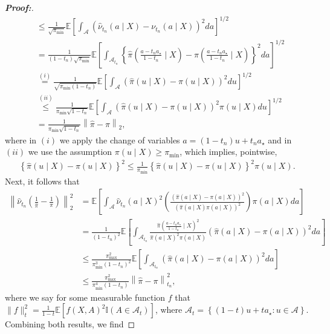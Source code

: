 \documentclass[11pt,twoside]{article}
\theoremstyle{definition}
\theoremstyle{remark}
\begin{document}
\begin{proof}[\textbf{Proof:}]
\begin{align*}
    &\leq \frac{1}{\sqrt{\pi_{\min}}}\mathbb{E}\left[ \int_{\mathcal{A}}(\widehat{\nu}_{t_n}(a \mid X) - \nu_{t_n}(a \mid X))^2 da \right]^{1/2}  \\
    &= \frac{1}{(1-t_n)\sqrt{\pi_{\min}}}\mathbb{E}\left[ \int_{\mathcal{A}_{t_n}}\left\{\widehat{\pi}\left( \frac{a-t_na_\star}{1-t_n} \mid X\right) - \pi\left( \frac{a-t_na_\star}{1-t_n} \mid X\right)\right\}^2 da \right]^{1/2}  \\
    &\overset{(i)}{=} \frac{1}{\sqrt{\pi_{\min}(1 - t_n)}}\mathbb{E}\left[ \int_{\mathcal{A}}(\widehat{\pi}(u \mid X) - \pi(u \mid X))^2 du \right]^{1/2} \\
    &\overset{(ii)}{\leq} \frac{1}{\pi_{\min} \sqrt{1 - t_n}}\mathbb{E}\left[ \int_{\mathcal{A}}(\widehat{\pi}(u \mid X) - \pi(u \mid X))^2 \pi(u \mid X) du \right]^{1/2} \\
    &= \frac{1}{\pi_{\min} \sqrt{1 - t_n}} \left\| \widehat{\pi} - \pi \right\|_2,
\end{align*}
where in $(i)$ we apply the change of variables $a=(1-t_n)u+t_na_\star$ and in $(ii)$ we use the assumption $\pi(u\mid X)\geq\pi_{\min}$, which implies, pointwise,
\begin{align*}
    \left\{ \widehat{\pi}(u\mid X)-\pi(u\mid X) \right\}^2 \leq \frac{1}{\pi_{\min}} \left\{ \widehat{\pi}(u\mid X)-\pi(u\mid X) \right\}^2 \pi(u\mid X).
\end{align*}
Next, it follows that
\begin{align*}
    \left\|\widehat{\nu}_{t_n} \left(\frac{1}{\widehat{\pi}} - \frac{1}{\pi}\right) \right\|^2_2 &= \mathbb{E}\left[ \int_{\mathcal{A}} \widehat{\nu}_{t_n}(a \mid X)^2 \left(\frac{(\widehat{\pi}(a \mid X) - \pi(a \mid X))^2}{(\widehat{\pi}(a \mid X) \pi(a \mid X))^2} \right)\pi(a \mid X) da \right] \\
    &=\frac{1}{(1-t_n)^2} \mathbb{E}\left[ \int_{\mathcal{A}_{t_n}}\frac{\widehat{\pi} \left( \frac{a-t_na_\star}{1-t_n} \mid X \right)^2}{ \widehat{\pi}(a\mid X)^2 \pi(a\mid X)} \left( \widehat{\pi}(a\mid X) - \pi(a\mid X)\right)^2 da \right]\\
    &\leq  \frac{\pi_{\max}^2 }{ \pi_{\min}^3(1-t_n)^2} \mathbb{E}\left[\int_{\mathcal{A}_{t_n}}\left( \widehat{\pi}(a\mid X) - \pi(a\mid X) \right)^2 da \right]\\
    &\leq \frac{ \pi_{\max}^2}{\pi_{\min}^4(1-t_n)} \left\| \widehat{\pi}-\pi \right\|_{t_n}^2,
\end{align*}
where we say for some measurable function $f$ that $\|f\|^2_{t} =\frac{1}{1-t}\mathbb{E}\left[ f(X,A)^2\mathbb{I}(A\in\mathcal{A}_t) \right]$, where $\mathcal{A}_t = \left\{(1-t)u+ta_\star:u\in\mathcal{A} \right\}$. Combining both results, we find

\end{proof}
\end{document}
